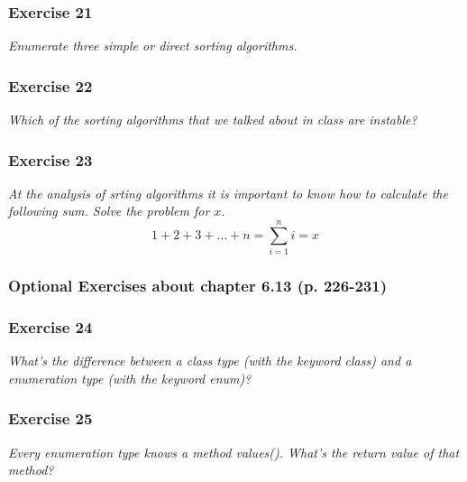 \subsubsection*{Exercise 21}
\textit{Enumerate three simple or direct sorting algorithms.} \\

\subsubsection*{Exercise 22}
\textit{Which of the sorting algorithms that we talked about in class 
are instable?} \\

\subsubsection*{Exercise 23}
\textit{At the analysis of srting algorithms it is important to know how to
calculate the following sum. Solve the problem for $x$.} \\
\[ 1 + 2 + 3 + \dots + n = \sum_{i=1}^{n} i = x \]

\subsubsection{Optional Exercises about chapter 6.13 (p. 226-231)}

\subsubsection*{Exercise 24}
\textit{What's the difference between a class type (with the keyword class)
and a enumeration type (with the keyword enum)?} \\

\subsubsection*{Exercise 25}
\textit{Every enumeration type knows a method values(). What's the return
value of that method?} \\

